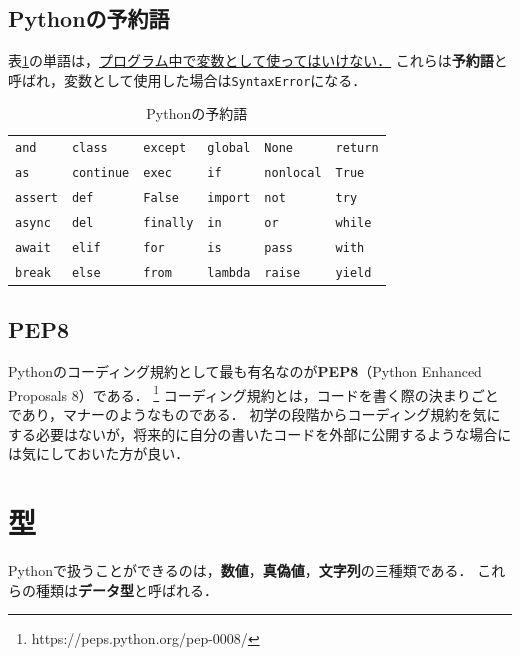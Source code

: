 \documentclass[a4paper,12pt]{jsarticle}
\begin{document}
\subsection{Pythonの予約語}

表\ref{tab:out_of_use}の単語は，\underline{プログラム中で変数として使ってはいけない．}
これらは{\bf 予約語}と呼ばれ，変数として使用した場合は\texttt{SyntaxError}になる．

\begin{table}[H]
    \centering
    \caption{Pythonの予約語}
    \begin{tabular}{llllll}
        \hline
        \texttt{and} & \texttt{class} & \texttt{except} & \texttt{global} & \texttt{None} & \texttt{return} \\
        \texttt{as} & \texttt{continue} & \texttt{exec} & \texttt{if} & \texttt{nonlocal} & \texttt{True} \\
        \texttt{assert} & \texttt{def} & \texttt{False} & \texttt{import} & \texttt{not} & \texttt{try} \\
        \texttt{async} & \texttt{del} & \texttt{finally} & \texttt{in} & \texttt{or} & \texttt{while} \\
        \texttt{await} & \texttt{elif} & \texttt{for} & \texttt{is} & \texttt{pass} & \texttt{with} \\
        \texttt{break} & \texttt{else} & \texttt{from} & \texttt{lambda} & \texttt{raise} & \texttt{yield} \\
        \hline
    \end{tabular}
    \label{tab:out_of_use}
\end{table}

\subsection{PEP8}

Pythonのコーディング規約として最も有名なのが{\bf PEP8}（Python Enhanced Proposals 8）である．
\footnote{https://peps.python.org/pep-0008/}
コーディング規約とは，コードを書く際の決まりごとであり，マナーのようなものである．
初学の段階からコーディング規約を気にする必要はないが，将来的に自分の書いたコードを外部に公開するような場合には気にしておいた方が良い．




\section{型}

Pythonで扱うことができるのは，{\bf 数値}，{\bf 真偽値}，{\bf 文字列}の三種類である．
これらの種類は{\bf データ型}と呼ばれる．
\end{document}
